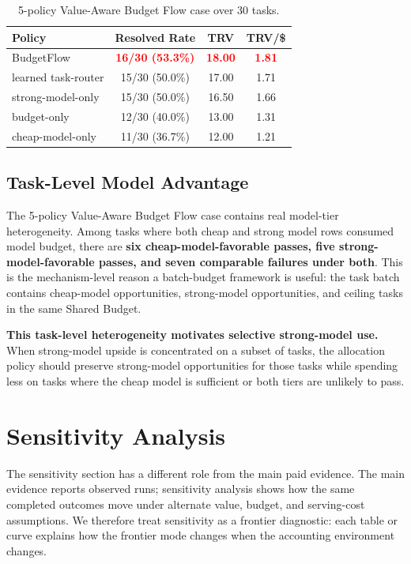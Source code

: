 \documentclass[sigconf,review,anonymous]{acmart}
\newcommand{\method}{BudgetFlow\xspace}
\newcommand{\sharedbudget}{Shared Budget\xspace}
\newcommand{\pos}[1]{\textcolor{red}{\textbf{#1}}}
\begin{document}
\begin{table}[t]
\centering
\small
\begin{tabular}{lccc}
\toprule
Policy & Resolved Rate & TRV & TRV/\$ \\
\midrule
\method & \pos{16/30 (53.3\%)} & \pos{18.00} & \pos{1.81} \\
learned task-router & 15/30 (50.0\%) & 17.00 & 1.71 \\
strong-model-only & 15/30 (50.0\%) & 16.50 & 1.66 \\
budget-only & 12/30 (40.0\%) & 13.00 & 1.31 \\
cheap-model-only & 11/30 (36.7\%) & 12.00 & 1.21 \\
\bottomrule
\end{tabular}
\caption{5-policy Value-Aware Budget Flow case over 30 tasks.}
\label{tab:full-vabf-case}
\end{table}

\subsection{Task-Level Model Advantage}
The 5-policy Value-Aware Budget Flow case contains real model-tier heterogeneity. Among tasks where both cheap and strong model rows consumed model budget, there are \textbf{six cheap-model-favorable passes, five strong-model-favorable passes, and seven comparable failures under both}. This is the mechanism-level reason a batch-budget framework is useful: the task batch contains cheap-model opportunities, strong-model opportunities, and ceiling tasks in the same \sharedbudget.

\textbf{This task-level heterogeneity motivates selective strong-model use.} When strong-model upside is concentrated on a subset of tasks, the allocation policy should preserve strong-model opportunities for those tasks while spending less on tasks where the cheap model is sufficient or both tiers are unlikely to pass.

\section{Sensitivity Analysis}
\label{sec:sensitivity}
The sensitivity section has a different role from the main paid evidence. The main evidence reports observed runs; sensitivity analysis shows how the same completed outcomes move under alternate value, budget, and serving-cost assumptions. We therefore treat sensitivity as a frontier diagnostic: each table or curve explains how the frontier mode changes when the accounting environment changes.
\end{document}
